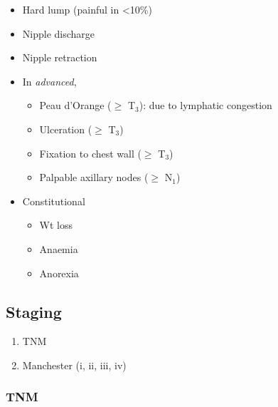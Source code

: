 \documentclass[
  14pt,
]{extarticle}
\providecommand{\tightlist}{%
  \setlength{\itemsep}{0pt}\setlength{\parskip}{0pt}}
\begin{document}
\begin{itemize}
\tightlist
\item
  Hard lump (painful in \textless10\%)
\item
  Nipple discharge
\item
  Nipple retraction
\item
  In \emph{advanced},

  \begin{itemize}
  \tightlist
  \item
    Peau d'Orange (\(\ge\) T\(_3\)): due to lymphatic congestion
  \item
    Ulceration (\(\ge\) T\(_3\))
  \item
    Fixation to chest wall (\(\ge\) T\(_3\))
  \item
    Palpable axillary nodes (\(\ge\) N\(_1\))
  \end{itemize}
\item
  Constitutional

  \begin{itemize}
  \tightlist
  \item
    Wt loss
  \item
    Anaemia
  \item
    Anorexia
  \end{itemize}
\end{itemize}

\hypertarget{staging-1}{%
\subsection{Staging}\label{staging-1}}

\begin{enumerate}
\def\labelenumi{\arabic{enumi}.}
\tightlist
\item
  TNM
\item
  Manchester (i, ii, iii, iv)
\end{enumerate}

\hypertarget{tnm}{%
\subsubsection{TNM}\label{tnm}}
\end{document}
